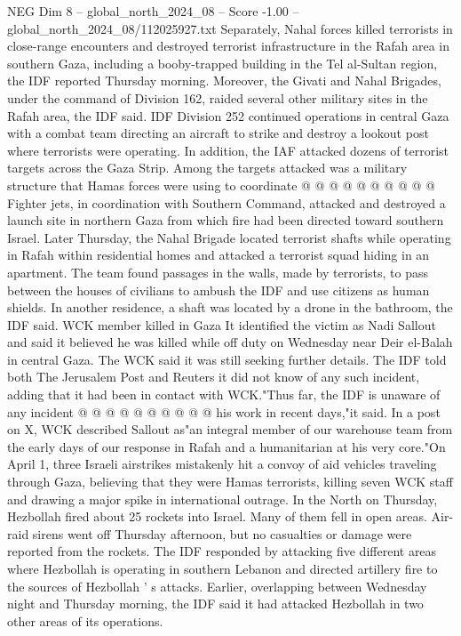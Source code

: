 \begin{textsample}{NEG Dim 8 – global\_north\_2024\_08 – Score -1.00 – global\_north\_2024\_08/112025927.txt}
Separately, Nahal forces killed terrorists in close-range encounters and destroyed terrorist infrastructure in the Rafah area in southern Gaza, including a booby-trapped building in the Tel al-Sultan region, the IDF reported Thursday morning.
Moreover, the Givati and Nahal Brigades, under the command of Division 162, raided several other military sites in the Rafah area, the IDF said.
IDF Division 252 continued operations in central Gaza with a combat team directing an aircraft to strike and destroy a lookout post where terrorists were operating.
In addition, the IAF attacked dozens of terrorist targets across the Gaza Strip.
Among the targets attacked was a military structure that Hamas forces were using to coordinate @ @ @ @ @ @ @ @ @ @ Fighter jets, in coordination with Southern Command, attacked and destroyed a launch site in northern Gaza from which fire had been directed toward southern Israel.
Later Thursday, the Nahal Brigade located terrorist shafts while operating in Rafah within residential homes and attacked a terrorist squad hiding in an apartment.
The team found passages in the walls, made by terrorists, to pass between the houses of civilians to ambush the IDF and use citizens as human shields.
In another residence, a shaft was located by a drone in the bathroom, the IDF said.
WCK member killed in Gaza It identified the victim as Nadi Sallout and said it believed he was killed while off duty on Wednesday near Deir el-Balah in central Gaza.
The WCK said it was still seeking further details.
The IDF told both The Jerusalem Post and Reuters it did not know of any such incident, adding that it had been in contact with WCK."Thus far, the IDF is unaware of any incident @ @ @ @ @ @ @ @ @ @ his work in recent days,"it said.
In a post on X, WCK described Sallout as"an integral member of our warehouse team from the early days of our response in Rafah and a humanitarian at his very core."On April 1, three Israeli airstrikes mistakenly hit a convoy of aid vehicles traveling through Gaza, believing that they were Hamas terrorists, killing seven WCK staff and drawing a major spike in international outrage.
In the North on Thursday, Hezbollah fired about 25 rockets into Israel.
Many of them fell in open areas.
Air-raid sirens went off Thursday afternoon, but no casualties or damage were reported from the rockets.
The IDF responded by attacking five different areas where Hezbollah is operating in southern Lebanon and directed artillery fire to the sources of Hezbollah ' s attacks.
Earlier, overlapping between Wednesday night and Thursday morning, the IDF said it had attacked Hezbollah in two other areas of its operations.

\end{textsample}
